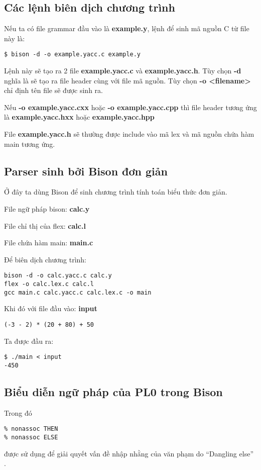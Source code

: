 \documentclass[../report.tex]{subfiles}
\begin{document}
\subsection{Các lệnh biên dịch chương trình}
Nếu ta có file grammar đầu vào là \textbf{example.y}, 
lệnh để sinh mã nguồn C từ file này là: 
\begin{verbatim}
$ bison -d -o example.yacc.c example.y
\end{verbatim}
Lệnh này sẽ tạo ra 2 file \textbf{example.yacc.c} và 
\textbf{example.yacc.h}. 
Tùy chọn \textbf{-d} nghĩa là sẽ tạo ra file header 
cùng với file mã nguồn. Tùy chọn \textbf{-o <filename>} 
chỉ định tên file sẽ được sinh ra. 

Nếu \textbf{-o example.yacc.cxx} hoặc \textbf{-o example.yacc.cpp}
thì file header tương 
ứng là \textbf{example.yacc.hxx} hoặc \textbf{example.yacc.hpp}

File \textbf{example.yacc.h} sẽ thường được include vào 
mã lex và mã nguồn chứa hàm main tương ứng. 

\subsection{Parser sinh bởi Bison đơn giản}
Ở đây ta dùng Bison để sinh chương trình tính toán 
biểu thức đơn giản.

File ngữ pháp bison: \textbf{calc.y}


File chỉ thị của flex: \textbf{calc.l}


File chứa hàm main: \textbf{main.c}


Để biên dịch chương trình: 
\begin{verbatim}
bison -d -o calc.yacc.c calc.y
flex -o calc.lex.c calc.l
gcc main.c calc.yacc.c calc.lex.c -o main
\end{verbatim}
 
Khi đó với file đầu vào: \textbf{input}
\begin{verbatim}
(-3 - 2) * (20 + 80) + 50
\end{verbatim}

Ta được đầu ra: 
\begin{verbatim}
$ ./main < input
-450
\end{verbatim}

\subsection{Biểu diễn ngữ pháp của PL0 trong Bison} 

Trong đó 
\begin{lstlisting}
% nonassoc THEN
% nonassoc ELSE
\end{lstlisting}
được sử dụng để giải quyết vấn đề nhập nhằng của 
văn phạm do ``Dangling else'' \cite{dangling-else}.
\end{document}
